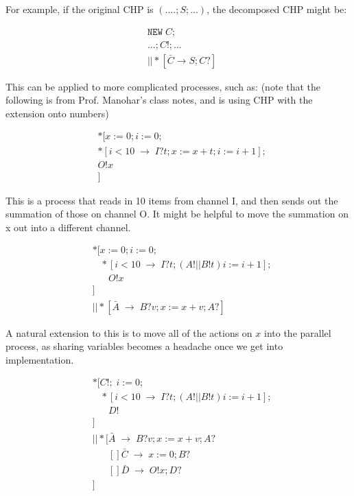 \documentclass[times,10pt]{article}
\begin{document}
For example, if the original CHP is $(....; S;...)$, the decomposed CHP might be: 

\begin{align*}
& \mathtt{NEW } \; C; \\
& ...; C!; ... \\
& || *[\bar{C} \rightarrow S; C?]
\end{align*}

This can be applied to more complicated processes, such as: (note that the following is from Prof. Manohar's class notes, and is using CHP with the extension onto numbers)

\begin{align*}
&*[ x := 0; i := 0; \\
&    *[ i < 10\; \rightarrow\; I?t; x := x + t; i := i + 1]; \\
&     O!x\\
& ]
\end{align*}

This is a process that reads in 10 items from channel I, and then sends out the summation of those on channel O.  It might be helpful to move the summation on x out into a different channel.

\begin{align*}
&*[ x := 0; i := 0; \\
& \;\;\;*[ i < 10\; \rightarrow\; I?t; (A! || B!t) i := i + 1];\\
& \;\;\;\;\;\;O!x\\
& ]\\
&|| *[ \bar{A} \; \rightarrow\; B?v; x := x+v; A?]
\end{align*}

A natural extension to this is to move all of the actions on $x$ into the parallel process, as sharing variables becomes a headache once we get into implementation.

\begin{align*}
&*[ C!; \;  i := 0;\\
& \;\;\;*[ i < 10\; \rightarrow\; I?t; (A! || B!t) i := i + 1];\\
& \;\;\;\;\;\;D!\\
& ]\\
&|| *[ \bar{A} \; \rightarrow\; B?v; x := x+v; A?\\
&\;\;\;\;\;\;[] \bar{C} \; \rightarrow\; x := 0; B?\\
& \;\;\;\;\;\;[] \bar{D}\; \rightarrow\; O!x; D? \\
&  ]
\end{align*}
\end{document}
